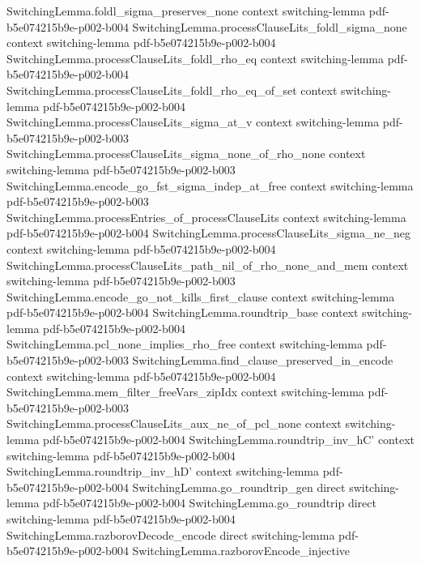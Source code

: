 \begin{lemma}
  {SwitchingLemma.foldl_sigma_preserves_none}
  {context}
  {switching-lemma}
  {pdf-b5e074215b9e-p002-b004}
\proofstep
  {SwitchingLemma.processClauseLits_foldl_sigma_none}
  {context}
  {switching-lemma}
  {pdf-b5e074215b9e-p002-b004}
\proofstep
  {SwitchingLemma.processClauseLits_foldl_rho_eq}
  {context}
  {switching-lemma}
  {pdf-b5e074215b9e-p002-b004}
\proofstep
  {SwitchingLemma.processClauseLits_foldl_rho_eq_of_set}
  {context}
  {switching-lemma}
  {pdf-b5e074215b9e-p002-b004}
\proofstep
  {SwitchingLemma.processClauseLits_sigma_at_v}
  {context}
  {switching-lemma}
  {pdf-b5e074215b9e-p002-b003}
\proofstep
  {SwitchingLemma.processClauseLits_sigma_none_of_rho_none}
  {context}
  {switching-lemma}
  {pdf-b5e074215b9e-p002-b003}
\proofstep
  {SwitchingLemma.encode_go_fst_sigma_indep_at_free}
  {context}
  {switching-lemma}
  {pdf-b5e074215b9e-p002-b003}
\proofstep
  {SwitchingLemma.processEntries_of_processClauseLits}
  {context}
  {switching-lemma}
  {pdf-b5e074215b9e-p002-b004}
\proofstep
  {SwitchingLemma.processClauseLits_sigma_ne_neg}
  {context}
  {switching-lemma}
  {pdf-b5e074215b9e-p002-b004}
\proofstep
  {SwitchingLemma.processClauseLits_path_nil_of_rho_none_and_mem}
  {context}
  {switching-lemma}
  {pdf-b5e074215b9e-p002-b003}
\proofstep
  {SwitchingLemma.encode_go_not_kills_first_clause}
  {context}
  {switching-lemma}
  {pdf-b5e074215b9e-p002-b004}
\proofstep
  {SwitchingLemma.roundtrip_base}
  {context}
  {switching-lemma}
  {pdf-b5e074215b9e-p002-b004}
\proofstep
  {SwitchingLemma.pcl_none_implies_rho_free}
  {context}
  {switching-lemma}
  {pdf-b5e074215b9e-p002-b003}
\proofstep
  {SwitchingLemma.find_clause_preserved_in_encode}
  {context}
  {switching-lemma}
  {pdf-b5e074215b9e-p002-b004}
\proofstep
  {SwitchingLemma.mem_filter_freeVars_zipIdx}
  {context}
  {switching-lemma}
  {pdf-b5e074215b9e-p002-b003}
\proofstep
  {SwitchingLemma.processClauseLits_aux_ne_of_pcl_none}
  {context}
  {switching-lemma}
  {pdf-b5e074215b9e-p002-b004}
\proofstep
  {SwitchingLemma.roundtrip_inv_hC'}
  {context}
  {switching-lemma}
  {pdf-b5e074215b9e-p002-b004}
\proofstep
  {SwitchingLemma.roundtrip_inv_hD'}
  {context}
  {switching-lemma}
  {pdf-b5e074215b9e-p002-b004}
\proofstep
  {SwitchingLemma.go_roundtrip_gen}
  {direct}
  {switching-lemma}
  {pdf-b5e074215b9e-p002-b004}
\proofstep
  {SwitchingLemma.go_roundtrip}
  {direct}
  {switching-lemma}
  {pdf-b5e074215b9e-p002-b004}
\proofstep
  {SwitchingLemma.razborovDecode_encode}
  {direct}
  {switching-lemma}
  {pdf-b5e074215b9e-p002-b004}
\proofstep
  {SwitchingLemma.razborovEncode_injective}

\end{lemma}
